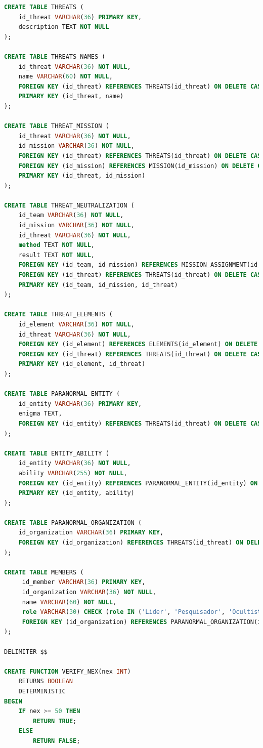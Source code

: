 \documentclass[12pt,a4paper]{report}
\begin{document}
\begin{lstlisting}[language=SQL, caption=ordemdb.sql]
CREATE TABLE THREATS (
    id_threat VARCHAR(36) PRIMARY KEY,
    description TEXT NOT NULL
);

CREATE TABLE THREATS_NAMES (
    id_threat VARCHAR(36) NOT NULL,
    name VARCHAR(60) NOT NULL,
    FOREIGN KEY (id_threat) REFERENCES THREATS(id_threat) ON DELETE CASCADE,
    PRIMARY KEY (id_threat, name)
);

CREATE TABLE THREAT_MISSION (
    id_threat VARCHAR(36) NOT NULL,
    id_mission VARCHAR(36) NOT NULL,
    FOREIGN KEY (id_threat) REFERENCES THREATS(id_threat) ON DELETE CASCADE,
    FOREIGN KEY (id_mission) REFERENCES MISSION(id_mission) ON DELETE CASCADE,
    PRIMARY KEY (id_threat, id_mission)
);

CREATE TABLE THREAT_NEUTRALIZATION (
    id_team VARCHAR(36) NOT NULL,
    id_mission VARCHAR(36) NOT NULL,
    id_threat VARCHAR(36) NOT NULL,
    method TEXT NOT NULL,
    result TEXT NOT NULL,
    FOREIGN KEY (id_team, id_mission) REFERENCES MISSION_ASSIGNMENT(id_team, id_mission) ON DELETE CASCADE,
    FOREIGN KEY (id_threat) REFERENCES THREATS(id_threat) ON DELETE CASCADE,
    PRIMARY KEY (id_team, id_mission, id_threat)
);

CREATE TABLE THREAT_ELEMENTS (
    id_element VARCHAR(36) NOT NULL,
    id_threat VARCHAR(36) NOT NULL,
    FOREIGN KEY (id_element) REFERENCES ELEMENTS(id_element) ON DELETE CASCADE,
    FOREIGN KEY (id_threat) REFERENCES THREATS(id_threat) ON DELETE CASCADE,
    PRIMARY KEY (id_element, id_threat)
);

CREATE TABLE PARANORMAL_ENTITY (
    id_entity VARCHAR(36) PRIMARY KEY,
    enigma TEXT,
    FOREIGN KEY (id_entity) REFERENCES THREATS(id_threat) ON DELETE CASCADE
);

CREATE TABLE ENTITY_ABILITY (
    id_entity VARCHAR(36) NOT NULL,
    ability VARCHAR(255) NOT NULL,
    FOREIGN KEY (id_entity) REFERENCES PARANORMAL_ENTITY(id_entity) ON DELETE CASCADE,
    PRIMARY KEY (id_entity, ability)
);

CREATE TABLE PARANORMAL_ORGANIZATION (
    id_organization VARCHAR(36) PRIMARY KEY,
    FOREIGN KEY (id_organization) REFERENCES THREATS(id_threat) ON DELETE CASCADE
);

CREATE TABLE MEMBERS (
     id_member VARCHAR(36) PRIMARY KEY,
     id_organization VARCHAR(36) NOT NULL,
     name VARCHAR(60) NOT NULL,
     role VARCHAR(30) CHECK (role IN ('Lider', 'Pesquisador', 'Ocultista', 'Simpatizante')),
     FOREIGN KEY (id_organization) REFERENCES PARANORMAL_ORGANIZATION(id_organization) ON DELETE CASCADE
);

DELIMITER $$

CREATE FUNCTION VERIFY_NEX(nex INT)
    RETURNS BOOLEAN
    DETERMINISTIC
BEGIN
    IF nex >= 50 THEN
        RETURN TRUE;
    ELSE
        RETURN FALSE;

\end{lstlisting}
\end{document}
